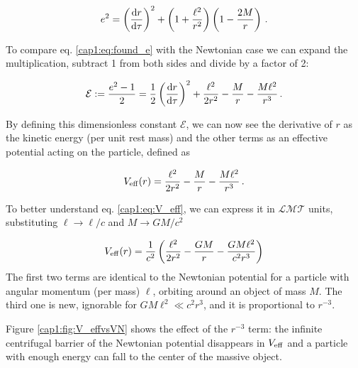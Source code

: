 \begin{equation}
    e^2 = \left(\dv{r}{\tau}\right)^2 + \left(1 + \frac{\ell^2}{r^2}\right)
    \left(1 - \frac{2M}{r} \right) \, .
   \label{cap1:eq:found_e}
\end{equation}

To compare eq. \ref{cap1:eq:found_e} with the Newtonian case we can expand
the multiplication, subtract 1 from both sides and divide by a factor of 2:

\begin{equation}
    \mathcal E := \frac{e^2 - 1}{2} = \frac{1}{2} \left(\dv{r}{\tau}\right)^2
    + \frac{\ell^2}{2 r^2} - \frac{M}{r} - \frac{M \ell^2}{r^3} \, .
    \label{cap1:eq:found_epsilon}
\end{equation}

By defining this dimensionless constant $\mathcal E$, we can now see the
derivative of $r$ as the kinetic energy (per unit rest mass) and the other
terms as an effective potential acting on the particle, defined as

\begin{equation}
    V_{\rm eff}(r)
    = \frac{\ell^2}{2 r^2} - \frac{M}{r} - \frac{M \ell^2}{r^3} \, .
    \label{cap1:eq:V_eff}
\end{equation}

To better understand eq. \ref{cap1:eq:V_eff}, we can express it in
$\mathcal{LMT}$ units, substituting $\ell \rightarrow \ell / c$ and 
$ M \rightarrow G M / c^2$

\begin{equation*}
    V_{\rm eff}(r)
    = \frac{1}{c^2} \left( \frac{\ell^2}{2 r^2} - \frac{G M}{r}
    - \frac{G M \ell^2}{c^2 r^3} \right)
\end{equation*}
The first two terms are identical to the Newtonian potential for a particle
with angular momentum (per mass) $\ell$, orbiting around an object of mass $M$.
The third one is new, ignorable for $GM\ell^2 \ll c^2 r^3$, and it is
proportional
to $r^{-3}$.

Figure \ref{cap1:fig:V_effvsVN} shows the effect of the $r^{-3}$ term: the
infinite centrifugal barrier of the Newtonian potential disappears in
$V_{\rm eff}$ and a particle with enough energy can fall to the center of the
massive object.

